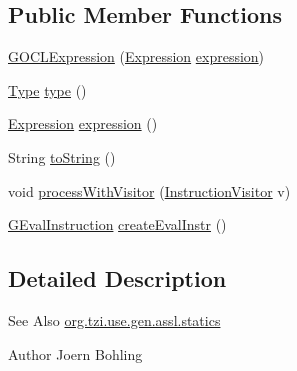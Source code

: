\subsection*{Public Member Functions}
\begin{DoxyCompactItemize}
\item 
\hyperlink{classorg_1_1tzi_1_1use_1_1gen_1_1assl_1_1statics_1_1_g_o_c_l_expression_a3b530686bf0e3bf54a0e4dd0e2d9e40c}{G\-O\-C\-L\-Expression} (\hyperlink{classorg_1_1tzi_1_1use_1_1uml_1_1ocl_1_1expr_1_1_expression}{Expression} \hyperlink{classorg_1_1tzi_1_1use_1_1gen_1_1assl_1_1statics_1_1_g_o_c_l_expression_afa8df1a86e15f15d9dedafa3892c6e85}{expression})
\item 
\hyperlink{interfaceorg_1_1tzi_1_1use_1_1uml_1_1ocl_1_1type_1_1_type}{Type} \hyperlink{classorg_1_1tzi_1_1use_1_1gen_1_1assl_1_1statics_1_1_g_o_c_l_expression_aa79ce3a98f696fd8997b4278889eea6b}{type} ()
\item 
\hyperlink{classorg_1_1tzi_1_1use_1_1uml_1_1ocl_1_1expr_1_1_expression}{Expression} \hyperlink{classorg_1_1tzi_1_1use_1_1gen_1_1assl_1_1statics_1_1_g_o_c_l_expression_afa8df1a86e15f15d9dedafa3892c6e85}{expression} ()
\item 
String \hyperlink{classorg_1_1tzi_1_1use_1_1gen_1_1assl_1_1statics_1_1_g_o_c_l_expression_ab8cfdf2187d9a870d3181691d65f5173}{to\-String} ()
\item 
void \hyperlink{classorg_1_1tzi_1_1use_1_1gen_1_1assl_1_1statics_1_1_g_o_c_l_expression_a6cdfa38cca0f3e5b97f751689f15f761}{process\-With\-Visitor} (\hyperlink{interfaceorg_1_1tzi_1_1use_1_1gen_1_1assl_1_1statics_1_1_instruction_visitor}{Instruction\-Visitor} v)
\item 
\hyperlink{classorg_1_1tzi_1_1use_1_1gen_1_1assl_1_1dynamics_1_1_g_eval_instruction}{G\-Eval\-Instruction} \hyperlink{classorg_1_1tzi_1_1use_1_1gen_1_1assl_1_1statics_1_1_g_o_c_l_expression_ad0341c4963658eed94f8c4300d5c007c}{create\-Eval\-Instr} ()
\end{DoxyCompactItemize}


\subsection{Detailed Description}
\begin{DoxySeeAlso}{See Also}
\hyperlink{namespaceorg_1_1tzi_1_1use_1_1gen_1_1assl_1_1statics}{org.\-tzi.\-use.\-gen.\-assl.\-statics} 
\end{DoxySeeAlso}
\begin{DoxyAuthor}{Author}
Joern Bohling 
\end{DoxyAuthor}


